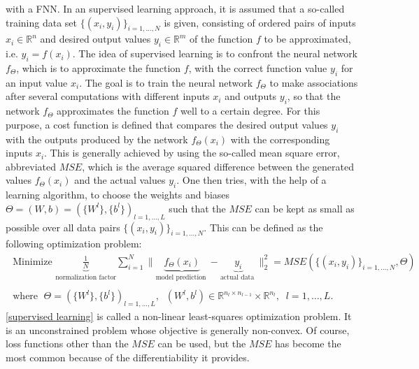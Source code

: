 with a FNN. In an supervised learning approach, it is assumed that a so-called training data set $\{ (x_i, y_i) \}_{i = 1, \ldots, N}$ is given, consisting of ordered pairs of inputs $x_i \in \mathbb{R}^n$ and desired output values $y_i \in \mathbb{R}^m$ of the function $f$ to be approximated, i.e. $y_i = f(x_i)$. The idea of supervised learning is to confront the neural network $f_{\Theta}$, which is to approximate the function $f$, with the correct function value $y_i$ for an input value $x_i$. The goal is to train the neural network $f_{\Theta}$ to make associations after several computations with different inputs $x_i$ and outputs $y_i$, so that the network $f_{\Theta}$ approximates the function $f$ well to a certain degree. For this purpose, a cost function is defined that compares the desired output values $y_i$ with the outputs produced by the network $f_{\Theta}(x_i)$ with the corresponding inputs $x_i$. This is generally achieved by using the so-called mean square error, abbreviated $MSE$, which is the average squared difference between the generated values $f_{\Theta}(x_i)$ and the actual values $y_i$. One then tries, with the help of a learning algorithm, to choose the weights and biases $\Theta = (W, b) = (\{ W^l \}, \{ b^l \})_{l = 1, \ldots, L}$ such that the $MSE$ can be kept as small as possible over all data pairs $\{ (x_i, y_i) \}_{i = 1, \ldots, N}$. This can be defined as the following optimization problem:
\begin{equation}
    \label{supervised learning}
    \begin{gathered}
        \text{ Minimize } \underbrace{\frac{1}{N}}_{\text{normalization factor}} \sum_{i=1}^{N} \lVert \underbrace{ f_{\Theta} \left(x_{i}\right)}_{\text{model prediction }} - \underbrace{y_{i}}_{\text{actual data }} \rVert^{2}_2 =  MSE(\{ (x_i, y_i) \}_{i = 1, \ldots, N}, \Theta) \\
        \\
        \text{ where } \; \Theta = (\{ W^l \}, \{ b^l \})_{l = 1, \ldots, L}, \; \; \left(W^{l}, b^{l}\right) \in \mathbb{R}^{n_l \times n_{l-1}} \times \mathbb{R}^{n_l}, \; \; l=1, \ldots, L .
    \end{gathered}
\end{equation}
\cref{supervised learning} is called a non-linear least-squares optimization problem. It is an unconstrained problem whose objective is generally non-convex. Of course, loss functions other than the $MSE$ can be used, but the $MSE$ has become the most common because of the differentiability it provides. \\
